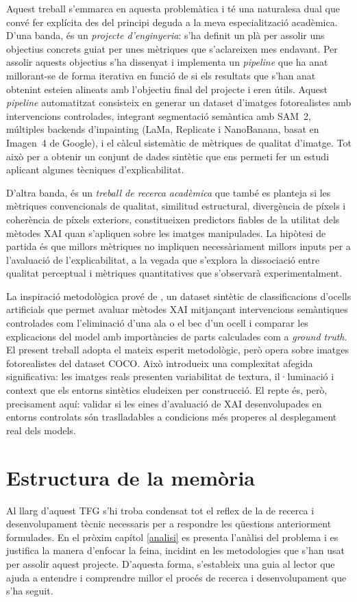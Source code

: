 Aquest treball s'emmarca en aquesta problemàtica i té una naturalesa dual que convé fer explícita des del principi deguda a la meva especialització acadèmica. D'una banda, és un \emph{projecte d'enginyeria}: s'ha definit un plà per assolir uns objectius concrets guiat per unes mètriques que s'aclareixen mes endavant. Per assolir aquests objectius s'ha dissenyat i implementa un \emph{pipeline} que ha anat millorant-se de forma iterativa en funció de si els resultats que s'han anat obtenint esteien alineats amb l'objectiu final del projecte i eren útils. Aquest \emph{pipeline} automatitzat consisteix en generar un dataset d'imatges fotorealistes amb intervencions controlades, integrant segmentació semàntica amb SAM~2, múltiples backends d'inpainting (LaMa, Replicate i NanoBanana, basat en Imagen~4 de Google), i el càlcul sistemàtic de mètriques de qualitat d'imatge. Tot això per a obtenir un conjunt de dades sintètic que ens permeti fer un estudi aplicant algunes tècniques d'explicabilitat. 

D'altra banda, és un \emph{treball de recerca acadèmica} que també es planteja si les mètriques convencionals de qualitat, similitud estructural, divergència de píxels i coherència de píxels exteriors, constitueixen predictors fiables de la utilitat dels mètodes \ac{XAI} quan s'apliquen sobre les imatges manipulades. La hipòtesi de partida és que millors mètriques no impliquen necessàriament millors inputs per a l'avaluació de l'explicabilitat, a la vegada que s'explora la dissociació entre qualitat perceptual i mètriques quantitatives que s'observarà experimentalment.

La inspiració metodològica prové de \cite{Hesse2023}, un dataset sintètic de classificacions d'ocells artificials que permet avaluar mètodes \ac{XAI} mitjançant intervencions semàntiques controlades com l'eliminació d'una ala o el bec d'un ocell i comparar les explicacions del model amb importàncies de parts calculades com a \textit{ground truth}. El present treball adopta el mateix esperit metodològic, però opera sobre imatges fotorealistes del dataset COCO. Això introdueix una complexitat afegida significativa: les imatges reals presenten variabilitat de textura, il·luminació i context que els entorns sintètics eludeixen per construcció. El repte és, però, precisament aquí: validar si les eines d'avaluació de \ac{XAI} desenvolupades en entorns controlats són traslladables a condicions més properes al desplegament real dels models. 

\section{Estructura de la memòria}
Al llarg d'aquest \ac{TFG} s'hi troba condensat tot el reflex de la de recerca i desenvolupament tècnic necessaris per a respondre les qüestions anteriorment formulades. En el pròxim capítol \ref{analisi} es presenta l'anàlisi del problema i es justifica la manera d'enfocar la feina, incidint en les metodologies que s'han usat per assolir aquest projecte. D'aquesta forma, s'estableix una guia al lector que ajuda a entendre i comprendre millor el procés de recerca i desenvolupament que s'ha seguit.

